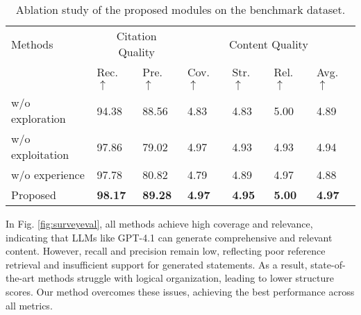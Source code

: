 \documentclass[manuscript,review,anonymous]{acmart}
\begin{document}
\begin{table}[h]
    \centering
        \begin{tabular}{lllllll}
            \toprule
            \multirow{2.5}{*}{Methods} & \multicolumn{2}{c}{Citation Quality} & \multicolumn{4}{c}{Content Quality} \\
            \cmidrule(lr){2-3} \cmidrule(lr){4-7}
            & Rec. $\uparrow$ & Pre. $\uparrow$ & Cov. $\uparrow$ & Str. $\uparrow$ & Rel. $\uparrow$ & Avg. $\uparrow$ \\
            \midrule
            w/o exploration  & 94.38 & 88.56 & 4.83 & 4.83 & 5.00 & 4.89 \\
            w/o exploitation & 97.86 & 79.02 & 4.97 & 4.93 & 4.93 & 4.94 \\
            w/o experience        & 97.78 & 80.82 & 4.79 & 4.89 & 4.97 & 4.88 \\
            \cellcolor{gray!15}Proposed & \cellcolor{gray!15}\textbf{98.17} & \cellcolor{gray!15}\textbf{89.28} & \cellcolor{gray!15}\textbf{4.97} & \cellcolor{gray!15}\textbf{4.95} & \cellcolor{gray!15}\textbf{5.00} & \cellcolor{gray!15}\textbf{4.97} \\
            \bottomrule
        \end{tabular}
    \caption{Ablation study of the proposed modules on the benchmark dataset.}
    \label{tab:ablation_study}
\end{table}

In Fig. \ref{fig:surveyeval}, all methods achieve high coverage and relevance, indicating that LLMs like GPT-4.1 can generate comprehensive and relevant content. However, recall and precision remain low, reflecting poor reference retrieval and insufficient support for generated statements. As a result, state-of-the-art methods struggle with logical organization, leading to lower structure scores. Our method overcomes these issues, achieving the best performance across all metrics.
\end{document}
